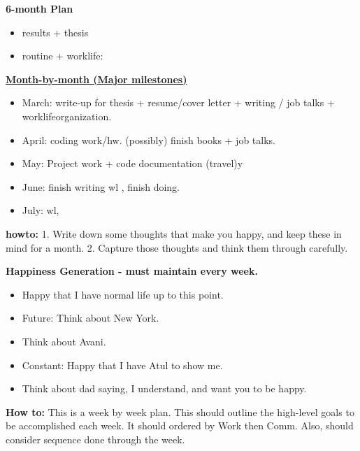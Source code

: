 \documentclass[11pt]{article}
\begin{document}
\textbf{6-month Plan} 
\begin{itemize} 
  \tiny \item \tiny results + thesis
\item \tiny routine + worklife:
\end{itemize}
\newpage
    {\small \underline{\textbf{Month-by-month (Major milestones)}}}\\
    \begin{itemize}
      \item \small March: write-up for thesis + resume/cover letter  +
         writing / job talks +    worklifeorganization. 
      \item \small April: coding work/hw. (possibly) finish books +
        job talks. 
      \item \small May: Project work + code documentation (travel)y
      \item \small June: finish writing wl , finish doing. 
 
        \item \small July:  wl, 

    \end{itemize} 

\newpage 
\textbf{howto:} 1. Write down some thoughts that make you happy, and
keep these in mind for a month.  2. Capture those thoughts and think them through carefully. 

\textbf{Happiness Generation - must maintain every week.}
\begin{itemize}
  \tiny \item \tiny Happy that I have normal life up to this point.
  \item \tiny Future: Think about New York. 
  \item \tiny Think about Avani. 
  \item \tiny Constant: Happy that I have Atul to show me.
  \item \tiny Think about dad saying, I understand, and want you to be happy. 
\end{itemize} 

\newpage 
\textbf{How to:} This is a week by week plan. This should outline the
high-level goals to be accomplished each week. It should ordered by
Work then Comm. Also, should consider sequence done through the week.  \\
\end{document}
